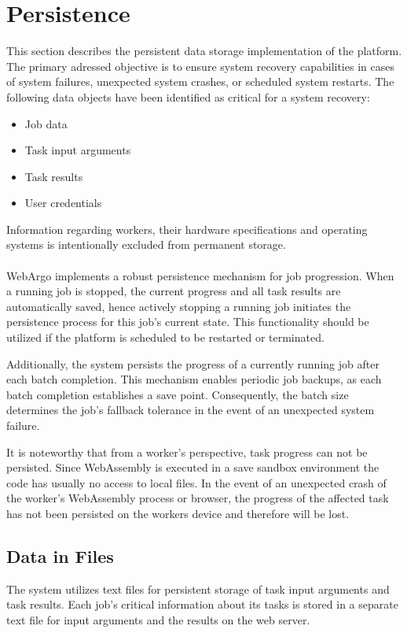 \section{Persistence}
\label{sec:implementation:persistence}
This section describes the persistent data storage implementation of the platform. The primary adressed objective is to ensure system recovery capabilities in cases of system failures, unexpected system crashes, or scheduled system restarts. The following data objects have been identified as critical for a system recovery:
\begin{itemize}
    \item Job data
    \item Task input arguments
    \item Task results
    \item User credentials
\end{itemize}
Information regarding workers, their hardware specifications and operating systems is intentionally excluded from permanent storage.
\\~\\
WebArgo implements a robust persistence mechanism for job progression. When a running job is stopped, the current progress and all task results are automatically saved, hence actively stopping a running job initiates the persistence process for this job's current state. This functionality should be utilized if the platform is scheduled to be restarted or terminated.

Additionally, the system persists the progress of a currently running job after each batch completion. This mechanism enables periodic job backups, as each batch completion establishes a save point. Consequently, the batch size determines the job's fallback tolerance in the event of an unexpected system failure.

It is noteworthy that from a worker's perspective, task progress can not be persisted. Since WebAssembly is executed in a save sandbox environment the code has usually no access to local files. In the event of an unexpected crash of the worker's WebAssembly process or browser, the progress of the affected task has not been persisted on the workers device and therefore will be lost.

\subsection{Data in Files}
The system utilizes text files for persistent storage of task input arguments and task results. Each job's critical information about its tasks is stored in a separate text file for input arguments and the results on the web server. 

